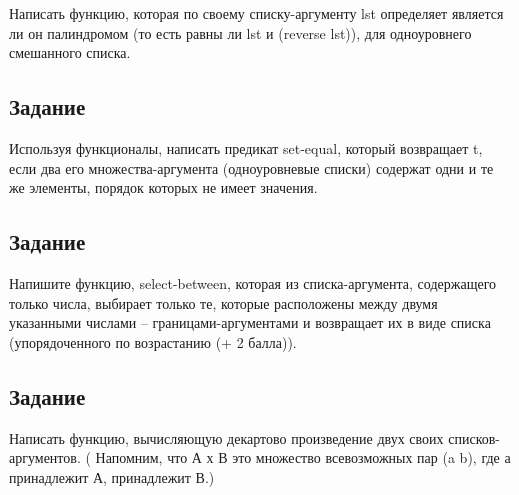 Написать функцию, которая по своему списку-аргументу lst определяет является ли он палиндромом (то есть равны ли lst и (reverse lst)), для одноуровнего смешанного списка.


\subsection{Задание }

Используя функционалы, написать предикат set-equal, который возвращает t, если два его множества-аргумента (одноуровневые списки) содержат одни и те же элементы, порядок которых не имеет значения.

\subsection{Задание }

Напишите функцию, select-between, которая из списка-аргумента, содержащего только числа, выбирает только те, которые расположены между двумя указанными числами -- границами-аргументами и возвращает их в виде списка (упорядоченного по возрастанию (+ 2 балла)).


\subsection{Задание }

Написать функцию, вычисляющую декартово произведение двух своих списков- аргументов. ( Напомним, что А х В это множество всевозможных пар (a b), где а принадлежит А, принадлежит В.)



